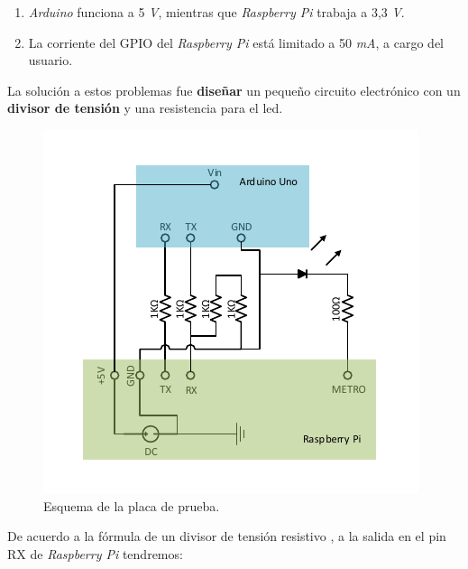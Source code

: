\begin{enumerate}
	\item \textit{Arduino} funciona a 5 \textit{V}, mientras que \textit{Raspberry Pi} trabaja a 3,3 \textit{V}.
	\item La corriente del \acrshort{GPIO} del \textit{Raspberry Pi} está limitado a 50 \textit{mA}, a cargo del usuario.
\end{enumerate}

La solución a estos problemas fue \textbf{diseñar} un pequeño circuito electrónico con un \textbf{divisor de tensión} y una resistencia para el \acrshort{led}.

\smallskip

\begin{figure}[H]
	\noindent \begin{centering}
		\includegraphics[width=\linewidth/2]{capitulo6/proto_esquema}
		\par\end{centering}
	\smallskip
	\caption{\label{fig:proto_esquema} Esquema de la placa de prueba.}
\end{figure} 

\smallskip

De acuerdo a la fórmula de un divisor de tensión resistivo \cite{wiki_divtension}, a la salida en el pin RX de \textit{Raspberry Pi} tendremos:


